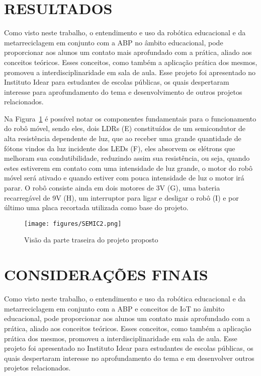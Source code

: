 \documentclass[a0,portrait,brazil]{a0poster}
\begin{document}
\begin{multicols}{3}
\begin{large}

\color{black}
\section*{RESULTADOS}

Como visto neste trabalho, o entendimento e uso da robótica educacional e da metarreciclagem em conjunto com a ABP no âmbito educacional, pode proporcionar aos alunos um contato mais aprofundado com a prática, aliado aos conceitos teóricos. Esses conceitos, como também a aplicação prática dos mesmos, promoveu a interdisciplinaridade em sala de aula. Esse projeto foi apresentado no Instituto Idear para estudantes de escolas públicas, os quais despertaram interesse para aprofundamento do tema e desenvolvimento de outros projetos relacionados.
\medskip

Na Figura~\ref{fig:fig2} é possível notar os componentes fundamentais para o funcionamento do robô móvel, sendo eles, dois LDRs (E) constituídos de um semicondutor de alta resistência dependente de luz, que ao receber uma grande quantidade de fótons vindos da luz incidente dos LEDs (F), eles absorvem os elétrons que melhoram sua condutibilidade, reduzindo assim sua resistência, ou seja, quando estes estiverem em contato com uma intensidade de luz grande, o motor do robô móvel será ativado e quando estiver com pouca intensidade de luz o motor irá parar. O robô consiste ainda em dois motores de 3V (G), uma bateria recarregável de 9V (H), um interruptor para ligar e desligar o robô (I) e por último uma placa recortada utilizada como base do projeto.
\medskip

\begin{figure}[H]
\centering
\texttt{[image: figures/SEMIC2.png]}
\caption{Visão da parte traseira do projeto proposto}
\label{fig:fig2}
\end{figure}

\color{black}
\section*{CONSIDERAÇÕES FINAIS}

Como visto neste trabalho, o entendimento e uso da robótica educacional e da metarreciclagem em conjunto com a ABP e conceitos de IoT no âmbito educacional, pode proporcionar aos alunos um contato mais aprofundado com a prática, aliado aos conceitos teóricos. Esses conceitos, como também a aplicação prática dos mesmos, promoveu a interdisciplinaridade em sala de aula. Esse projeto foi apresentado no Instituto Idear para estudantes de escolas públicas, os quais despertaram interesse no aprofundamento do tema e em desenvolver outros projetos relacionados. 



\end{large}
\end{multicols}
\end{document}
